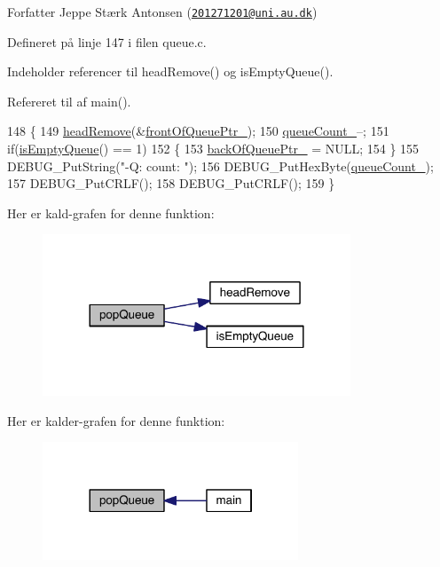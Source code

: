 \begin{DoxyAuthor}{Forfatter}
Jeppe Stærk Antonsen (\href{mailto:201271201@uni.au.dk}{\tt 201271201@uni.\+au.\+dk}) 
\end{DoxyAuthor}


Defineret på linje 147 i filen queue.\+c.



Indeholder referencer til head\+Remove() og is\+Empty\+Queue().



Refereret til af main().


\begin{DoxyCode}
148 \{
149   \hyperlink{class_queue_ae54666c891fd21d5497f48c385a00b74}{headRemove}(&\hyperlink{class_queue_aa48f05218d0a78402821c8aa9bdad06a}{frontOfQueuePtr\_});
150   \hyperlink{class_queue_ad260f9ccca00e80d161bbf3e70c3ffa6}{queueCount\_}--;
151   \textcolor{keywordflow}{if}(\hyperlink{class_queue_aafb324c79731abdc228dbf94d86722a3}{isEmptyQueue}() == 1)
152   \{
153     \hyperlink{class_queue_a225d2c9ad4e83d6da443e99b8869a51c}{backOfQueuePtr\_} = NULL;
154   \}
155   DEBUG\_PutString(\textcolor{stringliteral}{"-Q: count: "});
156   DEBUG\_PutHexByte(\hyperlink{class_queue_ad260f9ccca00e80d161bbf3e70c3ffa6}{queueCount\_});
157   DEBUG\_PutCRLF();
158   DEBUG\_PutCRLF();
159 \}
\end{DoxyCode}


Her er kald-\/grafen for denne funktion\+:\nopagebreak
\begin{figure}[H]
\begin{center}
\leavevmode
\includegraphics[width=260pt]{class_queue_a9ecab9ecdedfc331aed9a0ae63ce193b_cgraph}
\end{center}
\end{figure}




Her er kalder-\/grafen for denne funktion\+:\nopagebreak
\begin{figure}[H]
\begin{center}
\leavevmode
\includegraphics[width=216pt]{class_queue_a9ecab9ecdedfc331aed9a0ae63ce193b_icgraph}
\end{center}
\end{figure}


